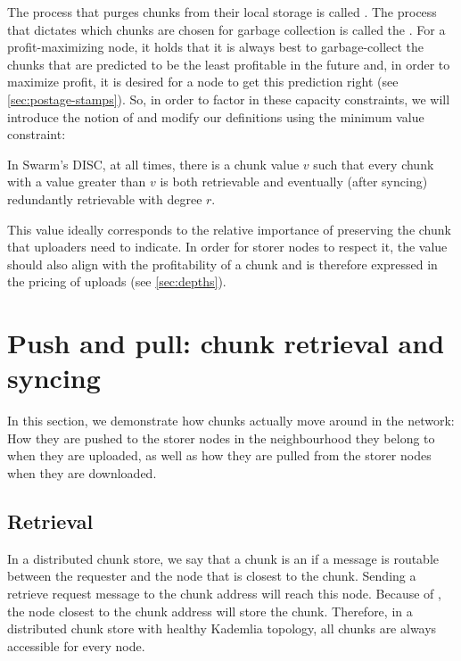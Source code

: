 The process that purges chunks from their local storage is called . The process that dictates which chunks are chosen for garbage collection is called the . For a profit-maximizing node, it holds that it is always best to garbage-collect the chunks that are predicted to be the least profitable in the future and, in order to maximize profit, it is desired for a node to get this prediction right (see \ref{sec:postage-stamps}). So, in order to factor in these capacity constraints, we will introduce the notion of  and modify our definitions using the minimum value constraint:

In Swarm's DISC, at all times, there is a chunk value $v$ such that every chunk with a value greater than $v$ is both retrievable and eventually (after syncing) redundantly retrievable with degree $r$. 

This value ideally corresponds to the relative importance of preserving the chunk that uploaders need to indicate. In order for storer nodes to respect it, the value should also align with the profitability of a chunk and is therefore expressed in the pricing of uploads (see \ref{sec:depths}).


\section{Push and pull: chunk retrieval and syncing\statusgreen}\label{sec:push-and-pull}
\green{}
In this section, we demonstrate how chunks actually move around in the network: How they are pushed to the storer nodes in the neighbourhood they belong to when they are uploaded, as well as how they are pulled from the storer nodes when they are downloaded.

\subsection{Retrieval\statusgreen}\label{sec:retrieval}

In a distributed chunk store, we say that a chunk is an  if a message is routable between the requester and the node that is closest to the chunk. Sending a retrieve request message to the chunk address will reach this node.  Because of , the node closest to the chunk address will store the chunk. Therefore, in a  distributed chunk store with healthy Kademlia topology, all chunks are always accessible for every node.

